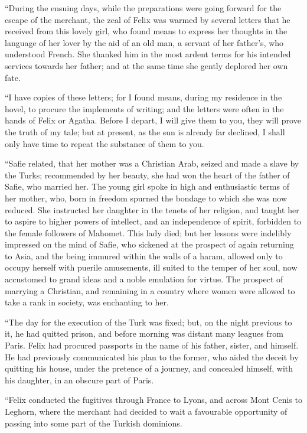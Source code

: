 ``During the ensuing days, while
the preparations were going forward
for the escape of the merchant, the zeal
of Felix was warmed by several letters
that he received from this lovely girl,
who found means to express her
thoughts in the language of her lover
by the aid of an old man, a servant of
her father's, who understood French.
She thanked him in the most ardent
terms for his intended services towards
her father; and at the same time she
gently deplored her own fate.

``I have copies of these letters; for I
found means, during my residence in
the hovel, to procure the implements
of writing; and the letters were often
in the hands of Felix or Agatha. Before
I depart, I will give them to you,
they will prove the truth of my tale;
but at present, as the sun is already far
declined, I shall only have time to repeat
the substance of them to you.

``Safie related, that her mother was
a Christian Arab, seized and made a
slave by the Turks; recommended by
her beauty, she had won the heart of
the father of Safie, who married her.
The young girl spoke in high and
enthusiastic terms of her mother, who,
born in freedom spurned the bondage
to which she was now reduced. She
instructed her daughter in the tenets
of her religion, and taught her to aspire
to higher powers of intellect, and an
independence of spirit, forbidden to the
female followers of Mahomet. This
lady died; but her lessons were indelibly
impressed on the mind of Safie,
who sickened at the prospect of again
returning to Asia, and the being immured
within the walls of a haram,
allowed only to occupy herself with
puerile amusements, ill suited to the
temper of her soul, now accustomed to
grand ideas and a noble emulation for
virtue. The prospect of marrying a
Christian, and remaining in a country
where women were allowed to take a
rank in society, was enchanting to her.

``The day for the execution of the
Turk was fixed; but, on the night
previous to it, he had quitted prison,
and before morning was distant many
leagues from Paris. Felix had procured
passports in the name of his father,
sister, and himself. He had previously
communicated his plan to the
former, who aided the deceit by quitting
his house, under the pretence of a
journey, and concealed himself, with his
daughter, in an obscure part of Paris.

``Felix conducted the fugitives
through France to Ly\-ons, and across
Mont Cenis to Leghorn, where the
merchant had decided to wait a favourable
opportunity of passing into some
part of the Turkish dominions.

